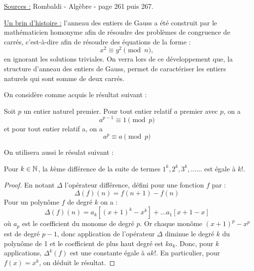 
\newcommand{\Ae}{A^{\ast}}
\newcommand{\Zi}{\Z[i]}
\newcommand{\Zie}{\Z[i]^{\ast}}
\newcommand{\Sd}{\Sigma_2}

\pagestyle{fancy}

\fancyhead[C]{}



\underline{Sources :} Rombaldi - Algèbre - page 261 puis 267. \newline

\underline{Un brin d'histoire :} l'anneau des entiers de Gauss a été construit par le mathématicien homonyme afin de résoudre des
problèmes de congruence de carrés, c'est-à-dire afin de résoudre des équations de la forme :
\[ x^2 \equiv y^2 \pmod n , \]
en ignorant les solutions triviales. On verra lors de ce développement que, la structure d'anneau des entiers de Gauss, 
permet de caractériser les entiers naturels qui sont somme de deux carrés.

\vspace{10pt}

On considère comme acquis le résultat suivant :

\begin{thm}[Fermat]
\label{thm:Fermat}
Soit $p$ un entier naturel premier. Pour tout entier relatif $a$ premier avec $p$, on a 
\[ a^{p-1} \equiv 1 \pmod p \]
 et pour tout entier relatif a, on a
\[ a^{p} \equiv a \pmod p \]
\end{thm}

On utilisera aussi le résulat suivant :

\begin{lem}
\label{lem:kdiff}
Pour $k \in \mathbb{N}$, la $k$ème différence de la suite de termes $1^k, 2^k, 3^k, \dots... $ est égale à $k!$.
\end{lem}

\begin{proof}
En notant $\Delta$ l'opérateur différence, défini pour une fonction $f$ par :
\[ \Delta(f)(n) = f(n+1) - f(n) \]
Pour un polynôme $f$ de degré $k$ on a :
\[ \Delta(f)(n) = a_k[(x+1)^k - x^k] + \dots a_1[x+1 - x] \]
où $a_p$ est le coefficient du monome de degré $p$. Or chaque monôme $(x+1)^p - x^p$ est de degré $p-1$, 
donc application de l'opérateur $\Delta$ diminue le degré $k$ du polynôme de 1 et le coefficient de plus haut degré est $k a_k$.
Donc, pour $k$ applications, $\Delta^k(f)$ est une constante égale à $ak!$.
En particulier, pour $f(x)=x^k$, on déduit le résultat.

\end{proof}


